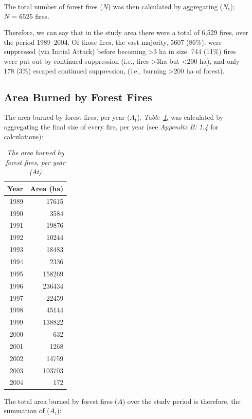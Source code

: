 \begin{spacing}{1.5}
\noindent The total number of forest fires ($N$) was then calculated by aggregating ($N_{\mathrm{t}}$); \\

\noindent $N$ = 6525 fires.

\clearpage

\noindent Therefore, we can say that in the study area there were a total of 6,529 fires, over the period 1989--2004. Of those fires, the vast majority, 5607 (86\%), were suppressed (via Initial Attack) before becoming >3 ha in size. 744 (11\%) fires were put out by continued suppression (i.e., fires >3ha but <200 ha), and only 178 (3\%) escaped continued suppression, (i.e., burning >200 ha of forest).

\subsection{Area Burned by Forest Fires}

The area burned by forest fires, per year ($A_{\mathrm{t}}$), \emph{Table~\ref{tab4}}, was calculated by aggregating the final size of every fire, per year (see \emph{Appendix B: 1.4} for calculations): \\


\begin{table}[ht]
\begin{center}
\begin{tabular}{|r|r|}
  \hline
Year & Area (ha) \\ 
  \hline
1989 & 17615 \\ 
  1990 & 3584 \\ 
  1991 & 19876 \\ 
  1992 & 10244 \\ 
  1993 & 18483 \\ 
  1994 & 2336 \\ 
  1995 & 158269 \\ 
  1996 & 236434 \\ 
  1997 & 22459 \\ 
  1998 & 45144 \\ 
  1999 & 138822 \\ 
  2000 & 632 \\ 
  2001 & 1268 \\ 
  2002 & 14759 \\ 
  2003 & 103703 \\ 
  2004 & 172 \\ 
   \hline
\end{tabular}
\caption[The area burned by forest fires, per year (At)]{\emph{The area burned by forest fires, per year (At)}}
\label{tab4}
\end{center}
\end{table}
\noindent The total area burned by forest fires ($A$) over the study period is therefore, the summation of ($A_{\mathrm{t}}$): \\



\end{spacing}
